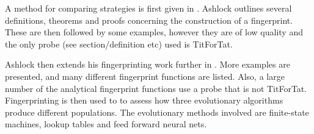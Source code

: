 A method for comparing strategies is first given in \cite{Ashlock2004}.
Ashlock outlines several definitions, theorems and proofs concerning the construction of a fingerprint.
These are then followed by some examples, however they are of low quality and the only probe (see section/definition etc) used is TitForTat.

Ashlock then extends his fingerprinting work further in \cite{Ashlock2008}.
More examples are presented, and many different fingerprint functions are listed.
Also, a large number of the analytical fingerprint functions use a probe that is not TitForTat.
Fingerprinting is then used to to assess how three evolutionary algorithms produce different populations.
The evolutionary methods involved are finite-state machines, lookup tables and feed forward neural nets.

